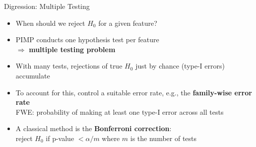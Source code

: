 \documentclass[10pt,compress,t,notes=noshow, xcolor=table]{beamer}
\begin{document}


\begin{frame}{Digression: Multiple Testing }

\begin{itemize}%
  \item When should we reject $H_0$ for a given feature?
  \item PIMP conducts one hypothesis test per feature \\$\Rightarrow$ \textbf{multiple testing problem}
  \item With many tests, rejections of true $H_0$ just by chance (type-I errors) accumulate
  \item To account for this, control a suitable error rate, e.g., the \textbf{family-wise error rate}\\
  FWE: probability of making at least one type-I error across all tests
  \item A classical method is the \textbf{Bonferroni correction}:\\
  reject $H_0$ if p-value $< \alpha/m$ 
  where $m$ is the number of tests
\end{itemize}

\end{frame}


\endlecture
\end{document}
